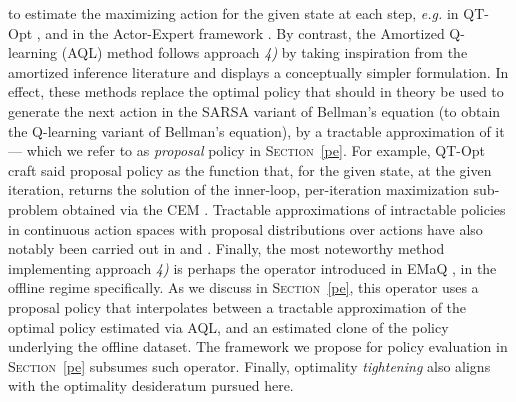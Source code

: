 to estimate the maximizing action for the given state at each step,
\textit{e.g.} in QT-Opt \cite{Kalashnikov2018-ck, Quillen2018-wp},
and in the Actor-Expert framework \cite{Lim2018-ey}.
By contrast, the Amortized Q-learning (AQL) \cite{Van_de_Wiele2018-qs} method
follows approach \textit{4)} by taking inspiration from the amortized inference literature and
displays a conceptually simpler formulation.
In effect, these methods replace the optimal policy
that should in theory be used to generate the next action
in the SARSA variant of Bellman's equation (to obtain the Q-learning variant of Bellman's equation),
by a tractable approximation of it --- which we refer to as \emph{proposal} policy in
\textsc{Section}~\ref{pe}.
For example, QT-Opt \cite{Kalashnikov2018-ck, Quillen2018-wp}
craft said proposal policy as the function that, for the given state, at the given iteration,
returns the solution of the inner-loop,
per-iteration maximization sub-problem obtained via the CEM \cite{Rubinstein1999-qt, Mannor2003-sj}.
Tractable approximations of intractable policies in continuous action spaces
with proposal distributions over actions have also notably been carried out in \cite{Hunt2019-yu}
and \cite{Wiehe2018-id}.
Finally, the most noteworthy method implementing approach \textit{4)}
is perhaps the operator introduced in EMaQ \cite{Ghasemipour2020-ro},
in the offline regime specifically.
As we discuss in \textsc{Section}~\ref{pe}, this operator uses a proposal policy that interpolates between
a tractable approximation of the optimal policy estimated via AQL,
and an estimated clone of the policy underlying the offline dataset.
The framework we propose for policy evaluation in \textsc{Section}~\ref{pe} subsumes such operator.
Finally, optimality \textit{tightening} \cite{He2017-si}
also aligns with the optimality desideratum pursued here.

